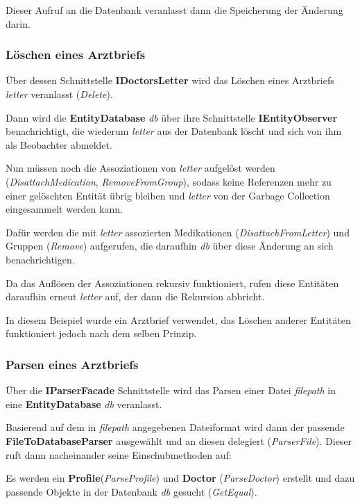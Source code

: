 \documentclass[a4paper]{scrreprt}
\begin{document}
Dieser Aufruf an die Datenbank veranlasst dann die Speicherung der Änderung darin.

\subsubsection{Löschen eines Arztbriefs}
Über dessen Schnittstelle \textbf{IDoctorsLetter} wird das Löschen eines Arztbriefs \textit{letter} veranlasst (\textit{Delete}).

Dann wird die \textbf{EntityDatabase} \textit{db} über ihre Schnittstelle \textbf{IEntityObserver} benachrichtigt, die wiederum \textit{letter} aus der Datenbank löscht und sich von ihm als Beobachter abmeldet.

Nun müssen noch die Assoziationen von \textit{letter} aufgelöst werden (\textit{DisattachMedication}, \textit{RemoveFromGroup}), sodass keine Referenzen mehr zu einer gelöschten Entität übrig bleiben und \textit{letter} von der Garbage Collection eingesammelt werden kann.

Dafür werden die mit \textit{letter} assozierten Medikationen (\textit{DisattachFromLetter}) und Gruppen (\textit{Remove}) aufgerufen, die daraufhin \textit{db} über diese Änderung an sich benachrichtigen.

Da das Auflösen der Assoziationen rekursiv funktioniert, rufen diese Entitäten daraufhin erneut \textit{letter} auf, der dann die Rekursion abbricht.

In diesem Beispiel wurde ein Arztbrief verwendet, das Löschen anderer Entitäten funktioniert jedoch nach dem selben Prinzip.

\subsubsection{Parsen eines Arztbriefs}
Über die \textbf{IParserFacade} Schnittstelle wird das Parsen einer Datei \textit{filepath} in eine \textbf{EntityDatabase} \textit{db} veranlasst.

Basierend auf dem in \textit{filepath} angegebenen Dateiformat wird dann der passende \textbf{FileToDatabaseParser} ausgewählt und an diesen delegiert (\textit{ParserFile}). Dieser ruft dann nacheinander seine Einschubmethoden auf:

Es werden ein \textbf{Profile}(\textit{ParseProfile}) und \textbf{Doctor} (\textit{ParseDoctor}) erstellt und dazu passende Objekte in der Datenbank \textit{db} gesucht (\textit{GetEqual}). 
\end{document}
